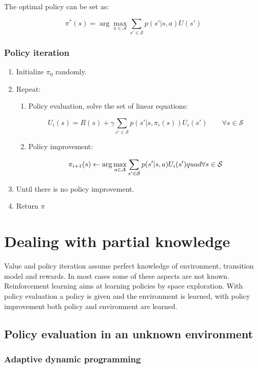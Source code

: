 		The optimal policy can be set as:

		$$\pi^*(s) = \arg\max\limits_{a\in\mathcal{A}}\sum\limits_{s'\in\mathcal{S}}p(s'|s,a)U(s')$$

		\subsubsection{Policy iteration}

		\begin{enumerate}
			\item Initialize $\pi_0$ randomly.
			\item Repeat:

				\begin{enumerate}
					\item Policy evaluation, solve the set of linear equations:

						$$U_i(s) = R(s) + \gamma\sum\limits_{s'\in\mathcal{S}}p(s'|s,\pi_i(s))U_i(s')\qquad\forall s\in\mathcal{S}$$

					\item Policy improvement:

						$$\pi_{i+1}(s)\leftarrow \arg\max\limits_{a\in\mathcal{A}}\sum\limits_{s'\in\mathcal{S}}p(s'|s,a)U_i(s')\\quad\forall s\in\mathcal{S}$$

				\end{enumerate}

			\item Until there is no policy improvement.
			\item Return $\pi$
		\end{enumerate}

\section{Dealing with partial knowledge}
Value and policy iteration assume perfect knowledge of environment, transition model and rewards.
In most cases some of these aspects are not known.
Reinforcement learning aims at learning policies by space exploration.
With policy evaluation a policy is given and the environment is learned, with policy improvement both policy and environment are learned.

	\subsection{Policy evaluation in an unknown environment}

		\subsubsection{Adaptive dynamic programming}
	
